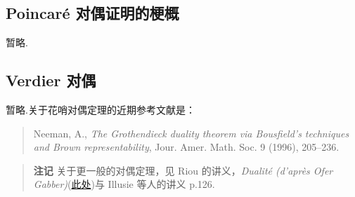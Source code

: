 \subsection*{Poincar\'e 对偶证明的梗概}

暂略.

\subsection*{Verdier 对偶}

暂略.关于花哨对偶定理的近期参考文献是：
\begin{quote}
Neeman, A., \emph{The Grothendieck duality theorem via Bousfield's techniques and Brown representability}, Jour. Amer. Math. Soc. 9 (1996), 205--236.
\end{quote}

\begin{quote}
\textbf{注记} 关于更一般的对偶定理，见 Riou 的讲义，\emph{Dualit\'e (d'apr\`es Ofer Gabber)}(\href{http://www.math.u-psud.fr/~riou/doc/dualite.pdf}{此处})与 Illusie 等人的讲义 p.126.
\end{quote}
